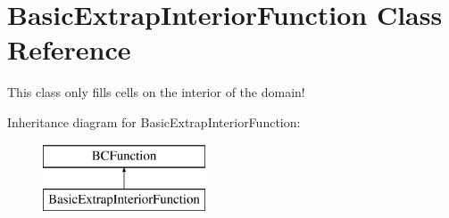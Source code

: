 \hypertarget{class_basic_extrap_interior_function}{\section{Basic\-Extrap\-Interior\-Function Class Reference}
\label{class_basic_extrap_interior_function}
}


This class only fills cells on the interior of the domain!  


Inheritance diagram for Basic\-Extrap\-Interior\-Function\-:\begin{figure}[H]
\begin{center}
\leavevmode
\includegraphics[height=2.000000cm]{class_basic_extrap_interior_function}
\end{center}
\end{figure}
